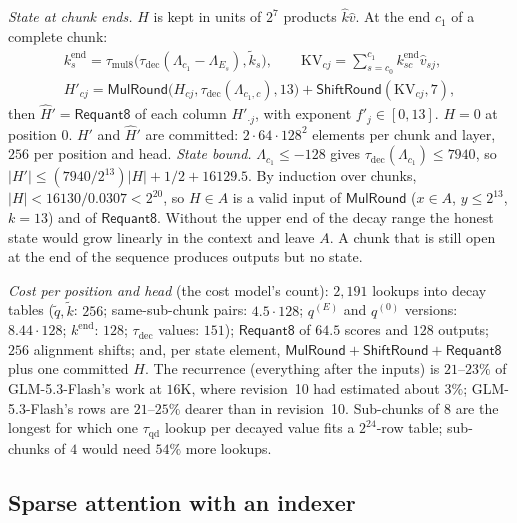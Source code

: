 \documentclass[11pt]{article}
\begin{document}
\emph{State at chunk ends.} \(H\) is kept in units of \(2^7\) products \(\hat k \hat v\). At the end \(c_1\) of a complete chunk:
\begin{gather*}
k^{\mathrm{end}}_s = \tau_{\mathrm{mul8}}\big(\tau_{\mathrm{dec}}(\Lambda_{c_1} - \Lambda_{E_s}), \tilde k_s\big),\qquad
\mathrm{KV}_{cj} = \textstyle\sum_{s = c_0}^{c_1} k^{\mathrm{end}}_{sc} \hat v_{sj},\\
H'_{cj} = \mathsf{MulRound}\big(H_{cj}, \tau_{\mathrm{dec}}(\Lambda_{c_1, c}), 13\big) + \mathsf{ShiftRound}(\mathrm{KV}_{cj}, 7),
\end{gather*}
then \(\hat H' = \mathsf{Requant8}\) of each column \(H'_{\cdot j}\), with exponent \(f'_j \in [0, 13]\). \(H = 0\) at position \(0\).
\(H'\) and \(\hat H'\) are committed: \(2\cdot 64\cdot 128^2\) elements per chunk and layer, \(256\) per position and head.
\emph{State bound.} \(\Lambda_{c_1} \le -128\) gives \(\tau_{\mathrm{dec}}(\Lambda_{c_1}) \le 7940\), so \(|H'| \le (7940/2^{13})|H| + 1/2 + 16129.5\). By induction over chunks, \(|H| < 16130/0.0307 < 2^{20}\), so \(H \in A\) is a valid input of \(\mathsf{MulRound}\) (\(x \in A\), \(y \le 2^{13}\), \(k = 13\)) and of \(\mathsf{Requant8}\).
Without the upper end of the decay range the honest state would grow linearly in the context and leave \(A\).
A chunk that is still open at the end of the sequence produces outputs but no state.

\emph{Cost per position and head} (the cost model's count): \(2{,}191\) lookups into decay tables (\(\tilde q, \tilde k\): \(256\); same-sub-chunk pairs: \(4.5\cdot 128\); \(q^{(E)}\) and \(q^{(0)}\) versions: \(8.44\cdot 128\); \(k^{\mathrm{end}}\): \(128\); \(\tau_{\mathrm{dec}}\) values: \(151\)); \(\mathsf{Requant8}\) of \(64.5\) scores and \(128\) outputs; \(256\) alignment shifts; and, per state element, \(\mathsf{MulRound} + \mathsf{ShiftRound} + \mathsf{Requant8}\) plus one committed \(H\).
The recurrence (everything after the inputs) is \(21\)--\(23\%\) of GLM-5.3-Flash's work at \(16\)K, where revision~10 had estimated about \(3\%\); GLM-5.3-Flash's rows are \(21\)--\(25\%\) dearer than in revision~10.
Sub-chunks of \(8\) are the longest for which one \(\tau_{\mathrm{qd}}\) lookup per decayed value fits a \(2^{24}\)-row table; sub-chunks of \(4\) would need \(54\%\) more lookups.

\subsection{Sparse attention with an indexer}
\label{sec:dsa}
\end{document}
